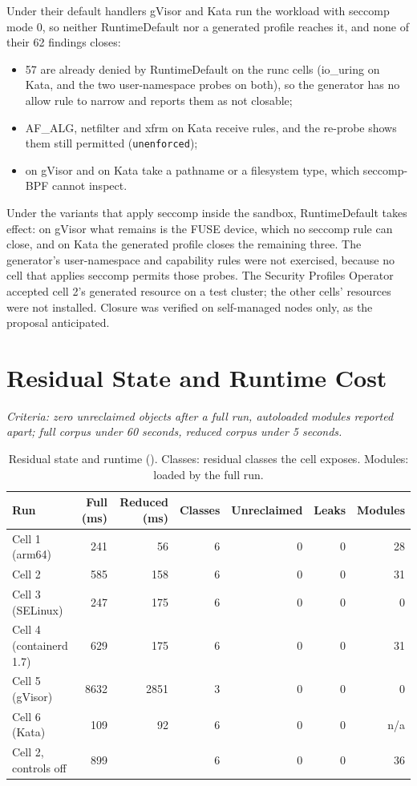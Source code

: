 Under their default handlers gVisor and Kata run the workload with seccomp mode 0, so neither RuntimeDefault nor a generated profile reaches it, and none of their 62 findings closes:
\begin{itemize}[leftmargin=*]
\item 57 are already denied by RuntimeDefault on the runc cells (io\_uring on Kata, and the two user-namespace probes on both), so the generator has no allow rule to narrow and reports them as not closable;
\item AF\_ALG, netfilter and xfrm on Kata receive rules, and the re-probe shows them still permitted (\texttt{unenforced});
\item {} on gVisor and  on Kata take a pathname or a filesystem type, which seccomp-BPF cannot inspect.
\end{itemize}
Under the variants that apply seccomp inside the sandbox, RuntimeDefault takes effect: on gVisor what remains is the FUSE device, which no seccomp rule can close, and on Kata the generated profile closes the remaining three. The generator's user-namespace and capability rules were not exercised, because no cell that applies seccomp permits those probes. The Security Profiles Operator accepted cell 2's generated resource on a test cluster; the other cells' resources were not installed. Closure was verified on self-managed nodes only, as the proposal anticipated.

\section{Residual State and Runtime Cost}
\label{sec:res-residual}

\emph{Criteria: zero unreclaimed objects after a full run, autoloaded modules reported apart; full corpus under 60 seconds, reduced corpus under 5 seconds.}

\begin{table}[htbp]
\centering\footnotesize
\begin{tabular}{@{}lrrrrrr@{}}
\toprule
\textbf{Run} & \textbf{Full (ms)} & \textbf{Reduced (ms)} & \textbf{Classes} & \textbf{Unreclaimed} & \textbf{Leaks} & \textbf{Modules} \\
\midrule
Cell 1 (arm64) & 241 & 56 & 6 & 0 & 0 & 28 \\
Cell 2 & 585 & 158 & 6 & 0 & 0 & 31 \\
Cell 3 (SELinux) & 247 & 175 & 6 & 0 & 0 & 0 \\
Cell 4 (containerd 1.7) & 629 & 175 & 6 & 0 & 0 & 31 \\
Cell 5 (gVisor) & 8632 & 2851 & 3 & 0 & 0 & 0 \\
Cell 6 (Kata) & 109 & 92 & 6 & 0 & 0 & n/a \\
Cell 2, controls off & 899 & & 6 & 0 & 0 & 36 \\
\bottomrule
\end{tabular}
\caption{Residual state and runtime (). Classes: residual classes the cell exposes. Modules: loaded by the full run.}
\label{tab:residual}
\end{table}

